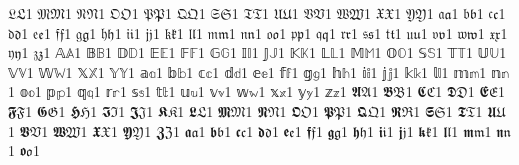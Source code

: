 {𝔏}{{\(\mathfrak{L}\)}}1 {𝔐}{{\(\mathfrak{M}\)}}1 {𝔑}{{\(\mathfrak{N}\)}}1 {𝔒}{{\(\mathfrak{O}\)}}1 {𝔓}{{\(\mathfrak{P}\)}}1 {𝔔}{{\(\mathfrak{Q}\)}}1 {𝔖}{{\(\mathfrak{S}\)}}1 {𝔗}{{\(\mathfrak{T}\)}}1 {𝔘}{{\(\mathfrak{U}\)}}1 {𝔙}{{\(\mathfrak{V}\)}}1 {𝔚}{{\(\mathfrak{W}\)}}1 {𝔛}{{\(\mathfrak{X}\)}}1 {𝔜}{{\(\mathfrak{Y}\)}}1 {𝔞}{{\(\mathfrak{a}\)}}1 {𝔟}{{\(\mathfrak{b}\)}}1 {𝔠}{{\(\mathfrak{c}\)}}1 {𝔡}{{\(\mathfrak{d}\)}}1 {𝔢}{{\(\mathfrak{e}\)}}1 {𝔣}{{\(\mathfrak{f}\)}}1 {𝔤}{{\(\mathfrak{g}\)}}1 {𝔥}{{\(\mathfrak{h}\)}}1 {𝔦}{{\(\mathfrak{i}\)}}1 {𝔧}{{\(\mathfrak{j}\)}}1 {𝔨}{{\(\mathfrak{k}\)}}1 {𝔩}{{\(\mathfrak{l}\)}}1 {𝔪}{{\(\mathfrak{m}\)}}1 {𝔫}{{\(\mathfrak{n}\)}}1 {𝔬}{{\(\mathfrak{o}\)}}1 {𝔭}{{\(\mathfrak{p}\)}}1 {𝔮}{{\(\mathfrak{q}\)}}1 {𝔯}{{\(\mathfrak{r}\)}}1 {𝔰}{{\(\mathfrak{s}\)}}1 {𝔱}{{\(\mathfrak{t}\)}}1 {𝔲}{{\(\mathfrak{u}\)}}1 {𝔳}{{\(\mathfrak{v}\)}}1 {𝔴}{{\(\mathfrak{w}\)}}1 {𝔵}{{\(\mathfrak{x}\)}}1 {𝔶}{{\(\mathfrak{y}\)}}1 {𝔷}{{\(\mathfrak{z}\)}}1 {𝔸}{{\(\mathbb{A}\)}}1 {𝔹}{{\(\mathbb{B}\)}}1 {𝔻}{{\(\mathbb{D}\)}}1 {𝔼}{{\(\mathbb{E}\)}}1 {𝔽}{{\(\mathbb{F}\)}}1 {𝔾}{{\(\mathbb{G}\)}}1 {𝕀}{{\(\mathbb{I}\)}}1 {𝕁}{{\(\mathbb{J}\)}}1 {𝕂}{{\(\mathbb{K}\)}}1 {𝕃}{{\(\mathbb{L}\)}}1 {𝕄}{{\(\mathbb{M}\)}}1 {𝕆}{{\(\mathbb{O}\)}}1 {𝕊}{{\(\mathbb{S}\)}}1 {𝕋}{{\(\mathbb{T}\)}}1 {𝕌}{{\(\mathbb{U}\)}}1 {𝕍}{{\(\mathbb{V}\)}}1 {𝕎}{{\(\mathbb{W}\)}}1 {𝕏}{{\(\mathbb{X}\)}}1 {𝕐}{{\(\mathbb{Y}\)}}1 {𝕒}{{\(\mathbb{a}\)}}1 {𝕓}{{\(\mathbb{b}\)}}1 {𝕔}{{\(\mathbb{c}\)}}1 {𝕕}{{\(\mathbb{d}\)}}1 {𝕖}{{\(\mathbb{e}\)}}1 {𝕗}{{\(\mathbb{f}\)}}1 {𝕘}{{\(\mathbb{g}\)}}1 {𝕙}{{\(\mathbb{h}\)}}1 {𝕚}{{\(\mathbb{i}\)}}1 {𝕛}{{\(\mathbb{j}\)}}1 {𝕜}{{\(\mathbb{k}\)}}1 {𝕝}{{\(\mathbb{l}\)}}1 {𝕞}{{\(\mathbb{m}\)}}1 {𝕟}{{\(\mathbb{n}\)}}1 {𝕠}{{\(\mathbb{o}\)}}1 {𝕡}{{\(\mathbb{p}\)}}1 {𝕢}{{\(\mathbb{q}\)}}1 {𝕣}{{\(\mathbb{r}\)}}1 {𝕤}{{\(\mathbb{s}\)}}1 {𝕥}{{\(\mathbb{t}\)}}1 {𝕦}{{\(\mathbb{u}\)}}1 {𝕧}{{\(\mathbb{v}\)}}1 {𝕨}{{\(\mathbb{w}\)}}1 {𝕩}{{\(\mathbb{x}\)}}1 {𝕪}{{\(\mathbb{y}\)}}1 {𝕫}{{\(\mathbb{z}\)}}1 {𝕬}{{\(\bm{{\mathfrak{A}}}\)}}1 {𝕭}{{\(\bm{{\mathfrak{B}}}\)}}1 {𝕮}{{\(\bm{{\mathfrak{C}}}\)}}1 {𝕯}{{\(\bm{{\mathfrak{D}}}\)}}1 {𝕰}{{\(\bm{{\mathfrak{E}}}\)}}1 {𝕱}{{\(\bm{{\mathfrak{F}}}\)}}1 {𝕲}{{\(\bm{{\mathfrak{G}}}\)}}1 {𝕳}{{\(\bm{{\mathfrak{H}}}\)}}1 {𝕴}{{\(\bm{{\mathfrak{I}}}\)}}1 {𝕵}{{\(\bm{{\mathfrak{J}}}\)}}1 {𝕶}{{\(\bm{{\mathfrak{K}}}\)}}1 {𝕷}{{\(\bm{{\mathfrak{L}}}\)}}1 {𝕸}{{\(\bm{{\mathfrak{M}}}\)}}1 {𝕹}{{\(\bm{{\mathfrak{N}}}\)}}1 {𝕺}{{\(\bm{{\mathfrak{O}}}\)}}1 {𝕻}{{\(\bm{{\mathfrak{P}}}\)}}1 {𝕼}{{\(\bm{{\mathfrak{Q}}}\)}}1 {𝕽}{{\(\bm{{\mathfrak{R}}}\)}}1 {𝕾}{{\(\bm{{\mathfrak{S}}}\)}}1 {𝕿}{{\(\bm{{\mathfrak{T}}}\)}}1 {𝖀}{{\(\bm{{\mathfrak{U}}}\)}}1 {𝖁}{{\(\bm{{\mathfrak{V}}}\)}}1 {𝖂}{{\(\bm{{\mathfrak{W}}}\)}}1 {𝖃}{{\(\bm{{\mathfrak{X}}}\)}}1 {𝖄}{{\(\bm{{\mathfrak{Y}}}\)}}1 {𝖅}{{\(\bm{{\mathfrak{Z}}}\)}}1 {𝖆}{{\(\bm{{\mathfrak{a}}}\)}}1 {𝖇}{{\(\bm{{\mathfrak{b}}}\)}}1 {𝖈}{{\(\bm{{\mathfrak{c}}}\)}}1 {𝖉}{{\(\bm{{\mathfrak{d}}}\)}}1 {𝖊}{{\(\bm{{\mathfrak{e}}}\)}}1 {𝖋}{{\(\bm{{\mathfrak{f}}}\)}}1 {𝖌}{{\(\bm{{\mathfrak{g}}}\)}}1 {𝖍}{{\(\bm{{\mathfrak{h}}}\)}}1 {𝖎}{{\(\bm{{\mathfrak{i}}}\)}}1 {𝖏}{{\(\bm{{\mathfrak{j}}}\)}}1 {𝖐}{{\(\bm{{\mathfrak{k}}}\)}}1 {𝖑}{{\(\bm{{\mathfrak{l}}}\)}}1 {𝖒}{{\(\bm{{\mathfrak{m}}}\)}}1 {𝖓}{{\(\bm{{\mathfrak{n}}}\)}}1 {𝖔}{{\(\bm{{\mathfrak{o}}}\)}}1 